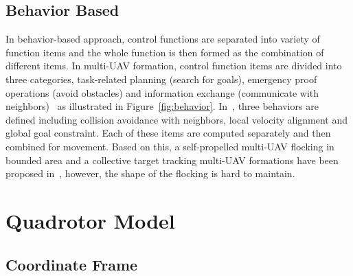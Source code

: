 \subsection{Behavior Based}
In behavior-based approach, control functions are separated into variety of function items and the whole function is then formed as the combination of different items. In multi-UAV formation, control function items are divided into three categories, task-related planning (search for goals), emergency proof operations (avoid obstacles) and information exchange (communicate with neighbors)~\cite{Behavior2004} as illustrated in Figure~\ref{fig:behavior}. In~\cite{Reynolds1987}, three behaviors are defined including collision avoidance with neighbors, local velocity alignment and global goal constraint. Each of these items are computed separately and then combined for movement. Based on this, a self-propelled multi-UAV flocking in bounded area and a collective target tracking multi-UAV formations have been proposed in~\cite{Vicsek2018}, however, the shape of the flocking is hard to maintain.


\section{Quadrotor Model}

\subsection{Coordinate Frame}

